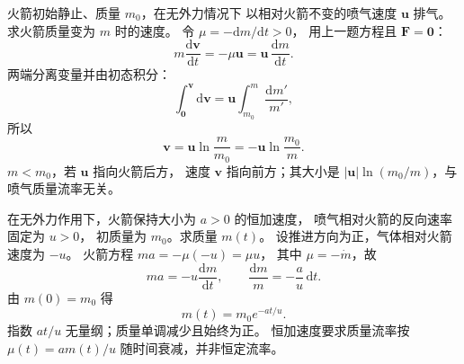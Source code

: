火箭初始静止、质量 $m_0$，在无外力情况下
以相对火箭不变的喷气速度 $\bm u$ 排气。
求火箭质量变为 $m$ 时的速度。
\exsolution
令 $\mu=-\mathrm dm/\mathrm dt>0$，
用上一题方程且 $\bm F=\bm0$：
\[
m\frac{\mathrm d\bm v}{\mathrm dt}
=-\mu\bm u=\bm u\,\frac{\mathrm dm}{\mathrm dt}.
\]
两端分离变量并由初态积分：
\[
\int_{\bm0}^{\bm v}\mathrm d\bm v
=\bm u\int_{m_0}^{m}\frac{\mathrm dm'}{m'},
\]
所以
\[
\boxed{\bm v=\bm u\ln\frac m{m_0}
=-\bm u\ln\frac{m_0}{m}}.
\]
\excheck $m<m_0$，若 $\bm u$ 指向火箭后方，
速度 $\bm v$ 指向前方；其大小是
$|\bm u|\ln(m_0/m)$，与喷气质量流率无关。

在无外力作用下，火箭保持大小为 $a>0$ 的恒加速度，
喷气相对火箭的反向速率固定为 $u>0$，
初质量为 $m_0$。求质量 $m(t)$。
\exsolution
设推进方向为正，气体相对火箭速度为 $-u$。
火箭方程 $ma=-\mu(-u)=\mu u$，
其中 $\mu=-\dot m$，故
\[
ma=-u\frac{\mathrm dm}{\mathrm dt},
\qquad\frac{\mathrm dm}{m}=-\frac au\,\mathrm dt.
\]
由 $m(0)=m_0$ 得
\[
\boxed{m(t)=m_0e^{-at/u}}.
\]
\excheck 指数 $at/u$ 无量纲；质量单调减少且始终为正。
恒加速度要求质量流率按 $\mu(t)=am(t)/u$
随时间衰减，并非恒定流率。
